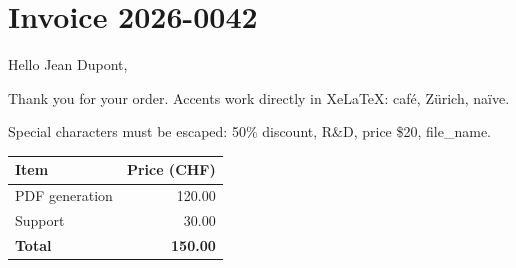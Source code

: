 \documentclass[11pt,a4paper]{article}
\newcommand{\customer}{Jean Dupont}
\newcommand{\invoiceno}{2026-0042}
\begin{document}
\section*{Invoice \invoiceno}

Hello \customer,

Thank you for your order. Accents work directly in XeLaTeX: café, Zürich, naïve.

Special characters must be escaped: 50\% discount, R\&D, price \$20, file\_name.

\begin{tabular}{|l|r|}
  \hline
  \textbf{Item} & \textbf{Price (CHF)} \\
  \hline
  PDF generation & 120.00 \\
  Support        &  30.00 \\
  \hline
  \textbf{Total} & \textbf{150.00} \\
  \hline
\end{tabular}
\end{document}
